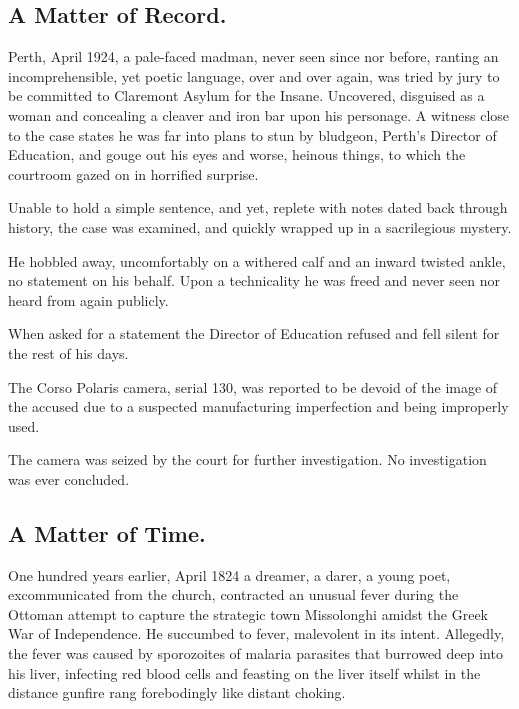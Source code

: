 

\prelude

\subsection*{A Matter of Record.}

Perth, April 1924, a pale-faced madman, never seen since nor before,
ranting an incomprehensible, yet poetic language, over and over again,
was tried by jury to be committed to Claremont Asylum for the
Insane. Uncovered, disguised as a woman and concealing a cleaver and
iron bar upon his personage. A witness close to the case states he was
far into plans to stun by bludgeon, Perth’s Director of Education, and
gouge out his eyes and worse, heinous things, to which the courtroom
gazed on in horrified surprise.

Unable to hold a simple sentence, and yet, replete with notes dated
back through history, the case was examined, and quickly wrapped up in
a sacrilegious mystery.

He hobbled away, uncomfortably on a withered calf and an inward
twisted ankle, no statement on his behalf. Upon a technicality he was
freed and never seen nor heard from again publicly.

When asked for a statement the Director of Education refused and fell
silent for the rest of his days.

The Corso Polaris camera, serial 130, was reported to be devoid of the
image of the accused due to a suspected manufacturing imperfection and
being improperly used.

The camera was seized by the court for further investigation. No
investigation was ever concluded.

\fugue

\subsection*{A Matter of Time.}

One hundred years earlier, April 1824 a dreamer, a darer, a young
poet, excommunicated from the church, contracted an unusual fever
during the Ottoman attempt to capture the strategic town Missolonghi
amidst the Greek War of Independence. He succumbed to fever,
malevolent in its intent. Allegedly, the fever was caused by
sporozoites of malaria parasites that burrowed deep into his liver,
infecting red blood cells and feasting on the liver itself whilst in
the distance gunfire rang forebodingly like distant choking.

